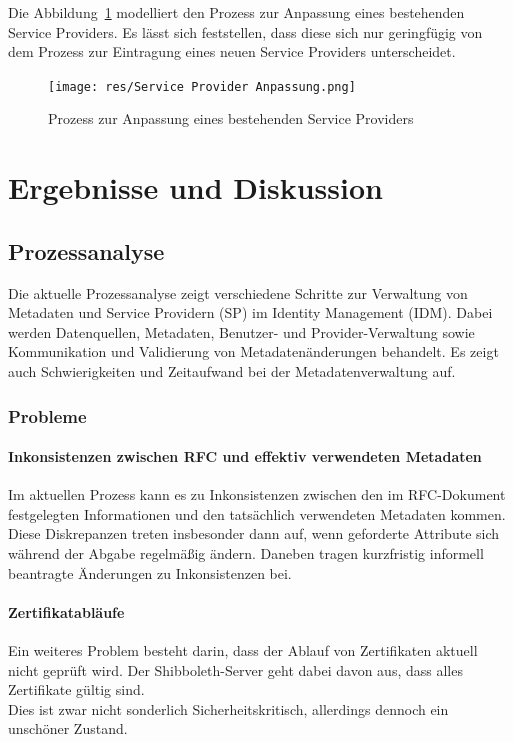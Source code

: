 \documentclass[a4paper, fontsize=11pt]{scrartcl}
\begin{document}
Die Abbildung~\ref{fig:service-provider-anpassung} modelliert den Prozess zur Anpassung eines bestehenden Service Providers. Es lässt sich feststellen, dass diese sich nur geringfügig von dem Prozess zur Eintragung eines neuen Service Providers unterscheidet.
\begin{figure}[H]
  \centering
  \texttt{[image: res/Service Provider Anpassung.png]}
  \caption{Prozess zur Anpassung eines bestehenden Service Providers}\label{fig:service-provider-anpassung}
\end{figure}

\section{Ergebnisse und Diskussion}\label{sec:results}

\subsection{Prozessanalyse}\label{subsec:prozessanalyse-results}
Die aktuelle Prozessanalyse zeigt verschiedene Schritte zur Verwaltung von Metadaten und Service Providern (SP) im Identity Management (IDM). 
Dabei werden Datenquellen, Metadaten, Benutzer- und Provider-Verwaltung sowie Kommunikation und Validierung von Metadatenänderungen behandelt.
Es zeigt auch Schwierigkeiten und Zeitaufwand bei der Metadatenverwaltung auf.

\subsubsection{Probleme}

\paragraph{Inkonsistenzen zwischen RFC und effektiv verwendeten Metadaten}
Im aktuellen Prozess kann es zu Inkonsistenzen zwischen den im RFC-Dokument festgelegten Informationen und den tatsächlich verwendeten Metadaten kommen. 
Diese Diskrepanzen treten insbesonder dann auf, wenn geforderte Attribute sich während der Abgabe regelmäßig ändern.
Daneben tragen kurzfristig informell beantragte Änderungen zu Inkonsistenzen bei.

\paragraph{Zertifikatabläufe}
Ein weiteres Problem besteht darin, dass der Ablauf von Zertifikaten aktuell nicht geprüft wird. Der Shibboleth-Server geht dabei davon aus, dass alles Zertifikate gültig sind.\\
Dies ist zwar nicht sonderlich Sicherheitskritisch, allerdings dennoch ein unschöner Zustand.
\end{document}
